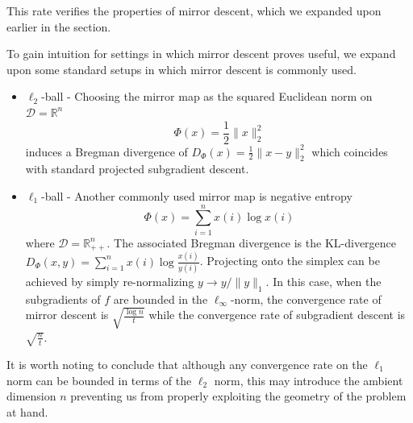This rate verifies the properties of mirror descent, which we expanded upon earlier in the section.

To gain intuition for settings in which mirror descent proves useful, we expand upon some standard setups in which mirror descent is commonly used.
\begin{itemize}
\item $\ell_2$-ball - Choosing the mirror map as the squared Euclidean norm on $\mathcal{D} = \mathbb{R}^n$
$$\Phi(x) = \frac{1}{2}\|x\|_2^2$$
induces a Bregman divergence of $D_{\Phi}(x) = \frac{1}{2}\|x - y\|_2^2$ which coincides with standard projected subgradient descent.
\item $\ell_1$-ball - Another commonly used mirror map is negative entropy
$$\Phi(x) = \sum_{i=1}^n x(i) \log x(i)$$
where $\mathcal{D} = \mathbb{R}^n_{++}$. The associated Bregman divergence is the KL-divergence $D_{\Phi}(x,y) = \sum_{i=1}^n x(i) \log \frac{x(i)}{y(i)}$. Projecting onto the simplex can be achieved by simply re-normalizing $y \rightarrow y/\|y\|_1$. In this case, when the subgradients of $f$ are bounded in the $\ell_{\infty}$-norm, the convergence rate of mirror descent is $\sqrt{\frac{\log n}{t}}$ while the convergence rate of subgradient descent is $\sqrt{\frac{n}{t}}$.
\end{itemize}

It is worth noting to conclude that although any convergence rate on the $\ell_1$ norm can be bounded in terms of the $\ell_2$ norm, this may introduce the ambient dimension $n$ preventing us from properly exploiting the geometry of the problem at hand.

